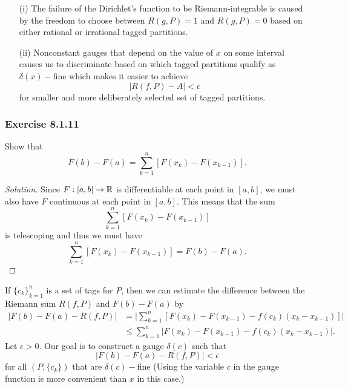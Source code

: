 \begin{enumerate}
    \item[(i)] The failure of the Dirichlet's function to be Riemann-integrable is caused by the freedom to choose between \( R(g,P)  = 1  \) and \( R(g,P) = 0  \) based on either rational or irrational tagged partitions.  
    \item[(ii) ] Nonconstant gauges that depend on the value of \( x  \) on some interval causes us to discriminate based on which tagged partitions qualify as \( \delta(x)- \)fine which makes it easier to achieve
        \[  | R(f,P) - A  | < \epsilon \]
        for smaller and more deliberately selected set of tagged partitions.
\end{enumerate}



\subsubsection{Exercise 8.1.11} Show that 
    \[  F(b) - F(a) = \sum_{ k=1 }^{ n } [F(x_{k} ) - F(x_{k-1})].\]
    \begin{proof}[Solution]
    Since \( F: [a,b] \to \mathbb{R}  \) is differentiable at each point in \( [a,b]  \), we must also have \( F  \) continuous at each point in \( [a,b]  \). This means that the sum 
    \[  \sum_{ k=1 }^{ n }[F(x_{k }) - F(x_{k-1})] \] is telescoping and thus we must have 
    \[  \sum_{ k=1 }^{ n }[F(x_{k }) - F(x_{k-1})] = F(b) - F(a). \] 
\end{proof} 


    If \( \{ c_{k }  \}_{k=1}^{n} \) is a set of tags for \( P  \), then we can estimate the difference between the Riemann sum \( R(f,P)  \) and \( F(b) - F(a)  \) by
\begin{align*}
    | F(b) - F(a) - R(f,P)  | &= \Big| \sum_{ k=1 }^{ n } [F(x_{k}) - F(x_{k-1}) - f(c_{k}) (x_{k } - x_{k-1})] \Big|  \\
                              &\leq \sum_{ k=1 }^{ n } | F(x_{k}) - F(x_{k-1}) - f(c_{k })(x_{k } - x_{k-1}) |.
\end{align*}
Let \( \epsilon > 0  \). Our goal is to construct a gauge \( \delta(c)  \) such that 
\[  | F(b) - F(a) - R(f,P)  | < \epsilon \]
for all \( (P, \{ c_{k } \} ) \) that are \( \delta(c)- \)fine (Using the variable \( c  \) in the gauge function is more convenient than \( x  \) in this case.)


